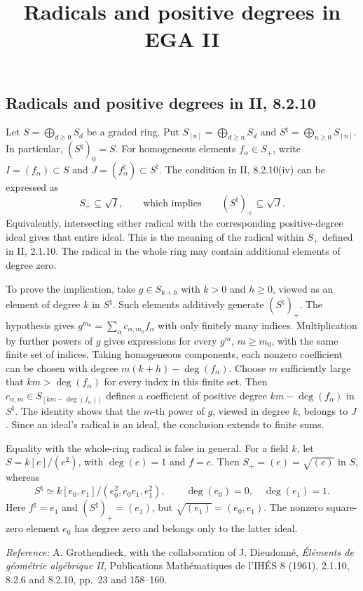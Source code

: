 \documentclass[11pt,a4paper]{article}
\title{Radicals and positive degrees in EGA II}
\author{}
\date{}
\begin{document}
\maketitle
\subsection*{Radicals and positive degrees in II, 8.2.10}

Let $S=\bigoplus_{d\geq0}S_d$ be a graded ring. Put
$S_{[n]}=\bigoplus_{d\geq n}S_d$ and
$S^\natural=\bigoplus_{n\geq0}S_{[n]}$. In particular,
$(S^\natural)_0=S$. For homogeneous elements $f_\alpha\in S_+$,
write $I=(f_\alpha)\subset S$ and
$J=(f_\alpha^\natural)\subset S^\natural$.
The condition in II, 8.2.10(iv) can be expressed as
\[
 S_+\subseteq\sqrt I,
 \qquad\text{which implies}\qquad
 (S^\natural)_+\subseteq\sqrt J.
\]
Equivalently, intersecting either radical with the corresponding
positive-degree ideal gives that entire ideal. This is the meaning
of the radical within $S_+$ defined in II, 2.1.10. The radical in
the whole ring may contain additional elements of degree zero.

To prove the implication, take $g\in S_{k+h}$ with $k>0$ and
$h\geq0$, viewed as an element of degree $k$ in $S^\natural$.
Such elements additively generate $(S^\natural)_+$.
The hypothesis gives $g^{m_0}=\sum_\alpha c_{\alpha,m_0}f_\alpha$
with only finitely many indices. Multiplication by further powers
of $g$ gives expressions for every $g^m$, $m\geq m_0$, with
the same finite set of indices. Taking homogeneous components,
each nonzero coefficient can be chosen with degree
$m(k+h)-\deg(f_\alpha)$. Choose $m$ sufficiently large that
$km>\deg(f_\alpha)$ for every index in this finite set.
Then $c_{\alpha,m}\in S_{[km-\deg(f_\alpha)]}$ defines a
coefficient of positive degree $km-\deg(f_\alpha)$ in
$S^\natural$. The identity shows that the $m$-th power of $g$,
viewed in degree $k$, belongs to $J$. Since an ideal's radical
is an ideal, the conclusion extends to finite sums.

Equality with the whole-ring radical is false in general.
For a field $k$, let $S=k[e]/(e^2)$, with $\deg(e)=1$ and $f=e$.
Then $S_+=(e)=\sqrt{(e)}$ in $S$, whereas
\[
 S^\natural\simeq k[e_0,e_1]/(e_0^2,e_0e_1,e_1^2),
 \qquad \deg(e_0)=0,\quad\deg(e_1)=1.
\]
Here $f^\natural=e_1$ and $(S^\natural)_+=(e_1)$, but
$\sqrt{(e_1)}=(e_0,e_1)$. The nonzero square-zero element
$e_0$ has degree zero and belongs only to the latter ideal.

\noindent\emph{Reference:} A. Grothendieck, with the collaboration
of J. Dieudonné, \emph{Éléments de géométrie algébrique II},
Publications Mathématiques de l'IHÉS 8 (1961), 2.1.10,
8.2.6 and 8.2.10, pp.~23 and 158--160.
\end{document}
